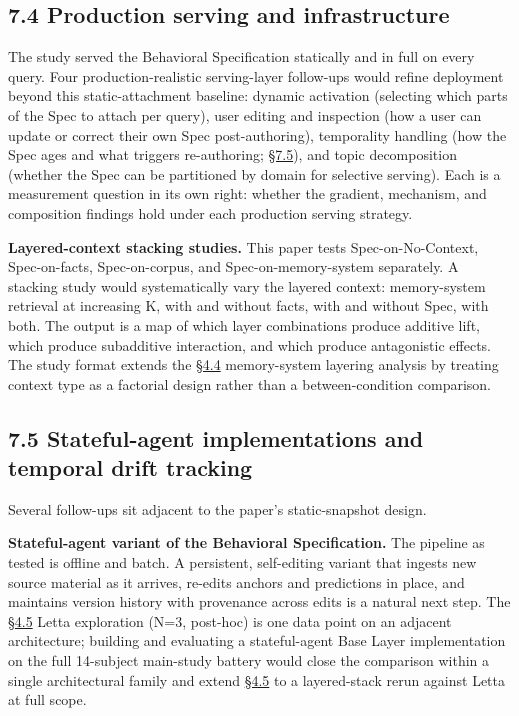 \hypertarget{production-serving-and-infrastructure}{%
\subsection{7.4 Production serving and
infrastructure}\label{production-serving-and-infrastructure}}

The study served the Behavioral Specification statically and in full on
every query. Four production-realistic serving-layer follow-ups would
refine deployment beyond this static-attachment baseline: dynamic
activation (selecting which parts of the Spec to attach per query), user
editing and inspection (how a user can update or correct their own Spec
post-authoring), temporality handling (how the Spec ages and what
triggers re-authoring; \hyperref[stateful-agent-implementations-and-temporal-drift-tracking]{§7.5}), and topic decomposition (whether the Spec
can be partitioned by domain for selective serving). Each is a
measurement question in its own right: whether the gradient, mechanism,
and composition findings hold under each production serving strategy.

\textbf{Layered-context stacking studies.} This paper tests
Spec-on-No-Context, Spec-on-facts, Spec-on-corpus, and
Spec-on-memory-system separately. A stacking study would systematically
vary the layered context: memory-system retrieval at increasing K, with
and without facts, with and without Spec, with both. The output is a map
of which layer combinations produce additive lift, which produce
subadditive interaction, and which produce antagonistic effects. The
study format extends the \hyperref[memory-system-composition]{§4.4} memory-system layering analysis by
treating context type as a factorial design rather than a
between-condition comparison.

\hypertarget{stateful-agent-implementations-and-temporal-drift-tracking}{%
\subsection{7.5 Stateful-agent implementations and temporal drift
tracking}\label{stateful-agent-implementations-and-temporal-drift-tracking}}

Several follow-ups sit adjacent to the paper's static-snapshot design.

\textbf{Stateful-agent variant of the Behavioral Specification.} The
pipeline as tested is offline and batch. A persistent, self-editing
variant that ingests new source material as it arrives, re-edits anchors
and predictions in place, and maintains version history with provenance
across edits is a natural next step. The \hyperref[exploratory-case-study-letta-stateful-agent-n3-post-hoc]{§4.5} Letta exploration (N=3,
post-hoc) is one data point on an adjacent architecture; building and
evaluating a stateful-agent Base Layer implementation on the full
14-subject main-study battery would close the comparison within a single
architectural family and extend \hyperref[exploratory-case-study-letta-stateful-agent-n3-post-hoc]{§4.5} to a layered-stack rerun against
Letta at full scope.


